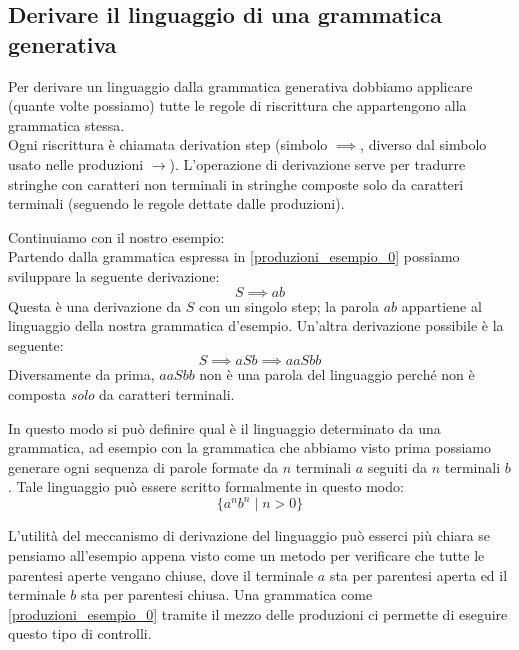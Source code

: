 \documentclass[class=book, crop=false, oneside, 12pt]{standalone}
\begin{document}
\subsection{Derivare il linguaggio di una grammatica generativa}
Per derivare un linguaggio dalla grammatica generativa dobbiamo applicare (quante volte possiamo) tutte le regole di riscrittura che appartengono alla grammatica stessa.\\
Ogni riscrittura è chiamata derivation step (simbolo $\implies$, diverso dal simbolo usato nelle produzioni $\to$).
L’operazione di derivazione serve per tradurre stringhe con caratteri non terminali in stringhe composte solo da caratteri terminali (seguendo le regole dettate dalle produzioni).


Continuiamo con il nostro esempio:\\
Partendo dalla grammatica espressa in \ref{produzioni_esempio_0} possiamo sviluppare la seguente derivazione:
\begin{equation}
    S \implies ab
\end{equation}
Questa è una derivazione da $S$ con un singolo step; la parola $ab$ appartiene al linguaggio della nostra grammatica d’esempio.
Un'altra derivazione possibile è la seguente:
\begin{equation}
    S \implies aSb \implies aaSbb
\end{equation}
Diversamente da prima, $aaSbb$ non è una parola del linguaggio perché non è composta \emph{solo} da caratteri terminali.

In questo modo si può definire qual è il linguaggio determinato da una grammatica, ad esempio con la grammatica che abbiamo visto prima possiamo generare ogni sequenza di parole formate da $n$ terminali $a$ seguiti da $n$ terminali $b$.
Tale linguaggio può essere scritto formalmente in questo modo:
\begin{equation}
    \{a^n b^n \mid n>0\}
\end{equation}


L'utilità del meccanismo di derivazione del linguaggio può esserci più chiara se pensiamo all'esempio appena visto come un metodo per verificare che tutte le parentesi aperte vengano chiuse, dove il terminale $a$ sta per parentesi aperta ed il terminale $b$ sta per parentesi chiusa. Una grammatica come \ref{produzioni_esempio_0} tramite il mezzo delle produzioni ci permette di eseguire questo tipo di controlli.
\end{document}
